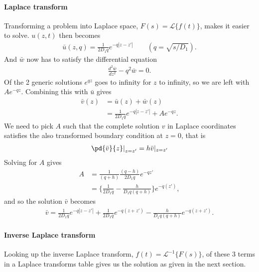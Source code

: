 \paragraph{Laplace transform}
Transforming a problem into Laplace space, $F(s) = \mathcal{L}\{f(t)\}$, makes 
it easier to solve. $u(z,t)$ then becomes
\begin{align}
  \bar{u}(z,q) = \frac{1}{2D_1q} e^{-q|z-z'|}
  \qquad (q=\sqrt{s/D_1}).
\end{align}
And $\bar{w}$ now has to satisfy the differential equation
\begin{align}
  \frac{d^2\bar{w}}{dz^2} - q^{2}\bar{w} = 0.
\end{align}
Of the 2 generic solutions $e^{qz}$ goes to infinity for $z$ to infinity, so 
we are left with $Ae^{-qz}$. Combining this with $\bar{u}$ gives
\begin{align}
  \bar{v}(z) &= \bar{u}(z) + \bar{w}(z)\\
  &= \frac{1}{2D_1q} e^{-q|z-z'|} + A e^{-qz}.
\end{align}
We need to pick $A$ such that the complete solution $v$ in Laplace coordinates
satisfies the also transformed boundary condition at $z=0$, that is
\begin{align}
  \left.\pd{\bar{v}}{z}\right|_{z=z'} = h\bar{v}|_{z=z'}
\end{align}
Solving for $A$ gives
\begin{align}
  A &= \frac{1}{(q+h)}\frac{(q-h)}{2D_1q}e^{-qz'}\\
  &=\{ \frac{1}{2D_1q} - \frac{h}{D_1 q(q+h)} \}e^{-q(z')},
\end{align}
and so the solution $\bar{v}$ becomes
\begin{align}
  \bar{v} = \frac{1}{2D_1q} e^{-q|z-z'|}
  + \frac{1}{2D_1q} e^{-q(z+z')} - \frac{h}{D_1 q (q+h)}e^{-q(z+z')}.
\end{align}


\paragraph{Inverse Laplace transform}
Looking up the inverse Laplace transform, $f(t) = \mathcal{L}^{-1}\{F(s)\}$,  
of these 3 terms in a Laplace transforms table gives us the solution as given 
in the next section.
